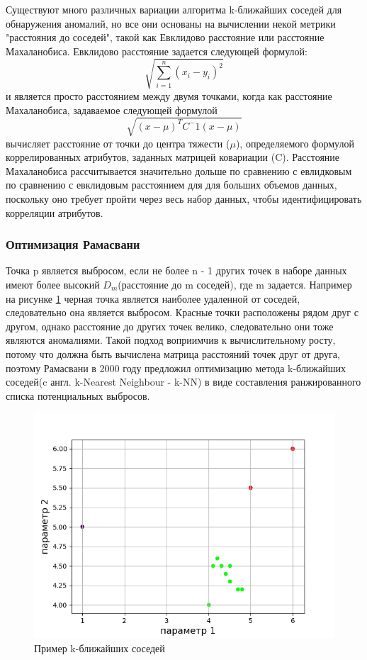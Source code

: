 Существуют много  различных вариации алгоритма k-ближайших соседей для обнаружения аномалий, но все они основаны на вычислении некой метрики "расстояния до соседей", такой как Евклидово расстояние или  расстояние Махаланобиса. Евклидово расстояние задается следующей формулой:
 	\begin{equation}
 	\sqrt{\sum_{i=1}^n(x_i-y_i)^2}
 		\end{equation}
 и является просто расстоянием между двумя точками, когда как  расстояние Махаланобиса, задаваемое следующей формулой
 	\begin{equation}
 	\sqrt{(x-\mu)^T C^-1 (x-\mu)}
 	\end{equation}
 	вычисляет расстояние от точки до центра тяжести ($\mu$), определяемого формулой коррелированных атрибутов, заданных матрицей ковариации (C). Расстояние  Махаланобиса
 	рассчитывается значительно дольше по сравнению с евлидковым
 	 по сравнению с евклидовым расстоянием для для больших объемов данных, поскольку оно требует
 	пройти через весь набор данных, чтобы идентифицировать корреляции атрибутов.

 \subsubsection{Оптимизация Рамасвани} 	
 Точка p является выбросом,
если не более n - 1 других точек в наборе данных имеют более высокий $D_m$(расстояние до m соседей), где m задается. Например на рисунке \ref{fig02} черная точка является наиболее удаленной от соседей, следовательно она является выбросом. Красные точки расположены рядом друг с другом, однако расстояние до других точек велико, следовательно они тоже являются аномалиями. Такой подход воприимчив к вычислительному росту, потому что должна быть вычислена матрица расстояний точек друг от друга, поэтому Рамасвани в 2000 году предложил оптимизацию метода k-ближайших соседей(c англ. k-Nearest Neighbour - k-NN)  в виде составления ранжированного списка потенциальных выбросов.
\begin{figure}
	\centering
	\includegraphics[width=.5\textwidth]{img/2.png}
	\caption{Пример k-ближайших соседей}
	\label{fig02}
\end{figure}

